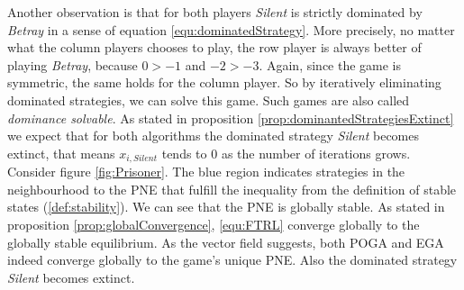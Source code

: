Another observation is that for both players \textit{Silent} is strictly dominated by \textit{Betray} in a sense of equation \ref{equ:dominatedStrategy}. More precisely, no matter what the column players chooses to play, the row player is always better of playing \textit{Betray}, because $0 > -1$ and $-2 > -3$. Again, since the game is symmetric, the same holds for the column player. So by iteratively eliminating dominated strategies, we can solve this game. Such games are also called \textit{dominance solvable}. As stated in proposition \ref{prop:dominantedStrategiesExtinct} we expect that for both algorithms the dominated strategy \textit{Silent} becomes extinct, that means $x_{i,Silent}$ tends to $0$ as the number of iterations grows.  \\

Consider figure \ref{fig:Prisoner}. The blue region indicates strategies in the neighbourhood to the PNE that fulfill the inequality from the definition of stable states (\ref{def:stability}). We can see that the PNE is globally stable. As stated in proposition \ref{prop:globalConvergence}, \ref{equ:FTRL} converge globally to the globally stable equilibrium. As the vector field suggests, both POGA and EGA indeed converge globally to the game's unique PNE. Also the dominated strategy \textit{Silent} becomes extinct.


